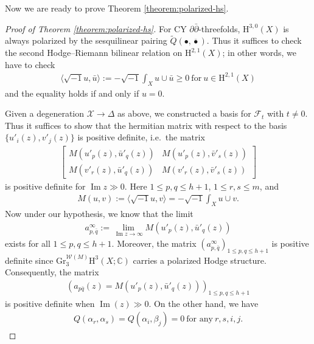 Now we are ready to prove Theorem \ref{theorem:polarized-hs}.
\begin{proof}[Proof of Theorem \ref{theorem:polarized-hs}]
For CY \(\partial\bar{\partial}\)-threefolds, \(\mathrm{H}^{3,0}(X)\)
is always polarized by the sesquilinear 
pairing \(\tilde{Q}(\bullet,\overline{\bullet})\). Thus it
suffices to check
the second Hodge--Riemann bilinear relation on \(\mathrm{H}^{2,1}(X)\);
in other words, we have to check
\begin{eqnarray*}
\langle \sqrt{-1}u,\bar{u}\rangle:=-\sqrt{-1}\int_{X} u\cup \bar{u}\ge 0~\mbox{for}~
u\in\mathrm{H}^{2,1}(X)
\end{eqnarray*}
and the equality holds if and only if \(u=0\).

Given a degeneration \(\mathcal{X}\to\Delta\) as above, we constructed 
a basis for \(\mathcal{F}_{t}\) with \(t\ne 0\).
Thus it suffices to show that the hermitian matrix with respect to
the basis \(\{u'_{i}(z),v'_{j}(z)\}\) is positive definite, i.e.~the matrix
\begin{eqnarray}
\label{eq:matrix}
\begin{bmatrix}
M(u'_{p}(z),\bar{u}'_{q}(z)) & M(u'_{p}(z),\bar{v}'_{s}(z))\\
M(v'_{r}(z),\bar{u}'_{q}(z)) & M(v'_{r}(z),\bar{v}'_{s}(z))
\end{bmatrix}
\end{eqnarray}
is positive definite for \(\operatorname{Im}z\gg 0\). 
Here \(1\le p,q\le h+1\), \(1\le r,s\le m\), and
\begin{eqnarray*}
M(u,v):=\langle \sqrt{-1}u, v\rangle = -\sqrt{-1}\int_{X} u\cup v.
\end{eqnarray*}
Now under our hypothesis, we know that the limit 
\begin{eqnarray*}
a_{p,\bar{q}}^{\infty}:=\lim_{\operatorname{Im}z\to\infty}M(u'_{p}(z),\bar{u}'_{q}(z))
\end{eqnarray*}
exists for all \(1\le p,q\le h+1\). Moreover, 
the matrix \((a_{p,\bar{q}}^{\infty})_{1\le p,q\le h+1}\)
is positive definite since 
\(\mathrm{Gr}_{3}^{\mathcal{W}(M)}\mathrm{H}^{3}(X;\mathbb{C})\) carries
a polarized Hodge structure.
Consequently, the matrix
\begin{eqnarray*}
(a_{p\bar{q}}(z)=M(u'_{p}(z),\bar{u}'_{q}(z)))_{1\le p,q\le h+1}
\end{eqnarray*}
is positive definite when \(\operatorname{Im}(z)\gg 0\).
On the other hand, we have
\begin{eqnarray*}
Q(\alpha_{r},\alpha_{s})=Q(\alpha_{i},\beta_{j})=0~\mbox{for any}~r,s,i,j.

\end{eqnarray*}
\end{proof}
